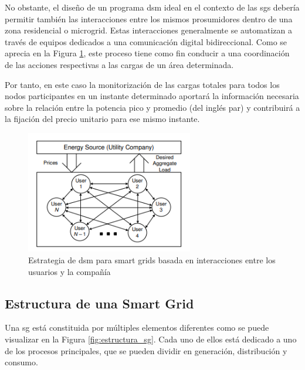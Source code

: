 \vspace{3mm}

No obstante, el diseño de un programa \gls{dsm} ideal en el contexto de las \gls{sg}s debería permitir también las interacciones entre los mismos prosumidores dentro de una zona residencial o microgrid. Estas interacciones generalmente se automatizan a través de equipos dedicados a una comunicación digital bidireccional. Como se aprecia en la Figura \ref{fig:dsm2}, este proceso tiene como fin conducir a una coordinación de las acciones respectivas a las cargas de un área determinada. 

\vspace{3mm}

Por tanto, en este caso la monitorización de las cargas totales para todos los nodos participantes en un instante determinado aportará la información necesaria sobre la relación entre la potencia pico y promedio (del inglés \gls{par}) y contribuirá a la fijación del precio unitario para ese mismo instante. \cite{pricing} 

\begin{figure}[h!]
  \centering
  \includegraphics[width=0.65\textwidth]{img/teoria/dsm2.png}
  \caption{Estrategia de \gls{dsm} para smart grids basada en interacciones entre los usuarios y la compañía \cite{pricing}}
  \label{fig:dsm2}
\end{figure}


\subsection{Estructura de una Smart Grid}

Una \gls{sg} está constituida por múltiples elementos diferentes como se puede visualizar en la Figura \ref{fig:estructura_sg}. Cada uno de ellos está dedicado a uno de los procesos principales, que se pueden dividir en generación, distribución y consumo. \cite{smartgrid_overview}

